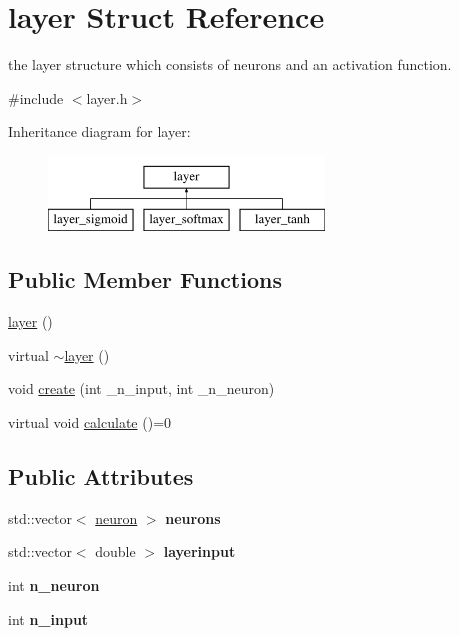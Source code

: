 \hypertarget{structlayer}{\section{layer Struct Reference}
\label{structlayer}
}


the layer structure which consists of neurons and an activation function.  




{\ttfamily \#include $<$layer.\-h$>$}

Inheritance diagram for layer\-:\begin{figure}[H]
\begin{center}
\leavevmode
\includegraphics[height=2.000000cm]{structlayer}
\end{center}
\end{figure}
\subsection*{Public Member Functions}
\begin{DoxyCompactItemize}
\item 
\hyperlink{structlayer_a95796de3b5f8aa07f49effa03a03f6f8}{layer} ()
\item 
virtual \hyperlink{structlayer_ae0781f14cd91478477526183951eb052}{$\sim$layer} ()
\item 
void \hyperlink{structlayer_a50ca540d57f99add95b7e92c96498810}{create} (int \-\_\-n\-\_\-input, int \-\_\-n\-\_\-neuron)
\item 
virtual void \hyperlink{structlayer_aacf7297d77c1ea2933d5551636f7c9ad}{calculate} ()=0
\end{DoxyCompactItemize}
\subsection*{Public Attributes}
\begin{DoxyCompactItemize}
\item 
\hypertarget{structlayer_a370f3ea69cfa52d599d8bb107276122d}{std\-::vector$<$ \hyperlink{structneuron}{neuron} $>$ {\bfseries neurons}}\label{structlayer_a370f3ea69cfa52d599d8bb107276122d}

\item 
\hypertarget{structlayer_aefd4997e805a4f4c3db2b5415104d215}{std\-::vector$<$ double $>$ {\bfseries layerinput}}\label{structlayer_aefd4997e805a4f4c3db2b5415104d215}

\item 
\hypertarget{structlayer_a17b545f98fb35b4b856e3e0c8d9a0876}{int {\bfseries n\-\_\-neuron}}\label{structlayer_a17b545f98fb35b4b856e3e0c8d9a0876}

\item 
\hypertarget{structlayer_a8323a6ef4cab8f81515ca964b79034fe}{int {\bfseries n\-\_\-input}}\label{structlayer_a8323a6ef4cab8f81515ca964b79034fe}

\end{DoxyCompactItemize}


